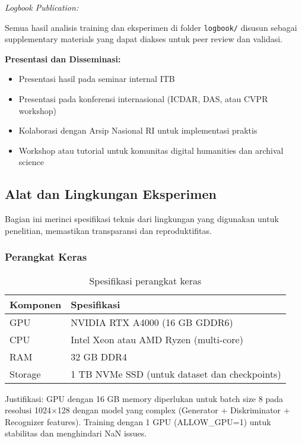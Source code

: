 \documentclass[12pt,a4paper]{article}
\begin{document}
\textit{Logbook Publication:}

Semua hasil analisis training dan eksperimen di folder \texttt{logbook/} disusun sebagai supplementary materials yang dapat diakses untuk peer review dan validasi.

\textbf{Presentasi dan Disseminasi:}

\begin{itemize}[leftmargin=*, nosep]
\item Presentasi hasil pada seminar internal ITB
\item Presentasi pada konferensi internasional (ICDAR, DAS, atau CVPR workshop)
\item Kolaborasi dengan Arsip Nasional RI untuk implementasi praktis
\item Workshop atau tutorial untuk komunitas digital humanities dan archival science
\end{itemize}

\subsection{Alat dan Lingkungan Eksperimen}
\label{subsec:tools-environment}

Bagian ini merinci spesifikasi teknis dari lingkungan yang digunakan untuk penelitian, memastikan transparansi dan reproduktifitas.

\subsubsection{Perangkat Keras}
\label{subsubsec:hardware}

\begin{table}[H]
\centering
\caption{Spesifikasi perangkat keras}
\label{tab:hardware-spec}
\small
\begin{tabular}{|l|l|}
\hline
\textbf{Komponen} & \textbf{Spesifikasi} \\ \hline
GPU & NVIDIA RTX A4000 (16 GB GDDR6) \\ \hline
CPU & Intel Xeon atau AMD Ryzen (multi-core) \\ \hline
RAM & 32 GB DDR4 \\ \hline
Storage & 1 TB NVMe SSD (untuk dataset dan checkpoints) \\ \hline
\end{tabular}
\end{table}

Justifikasi: GPU dengan 16 GB memory diperlukan untuk batch size 8 pada resolusi 1024$\times$128 dengan model yang complex (Generator + Diskriminator + Recognizer features). Training dengan 1 GPU (ALLOW\_GPU=1) untuk stabilitas dan menghindari NaN issues.
\end{document}
